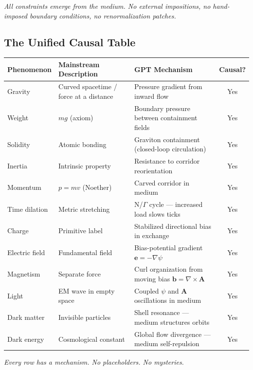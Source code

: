 \documentclass[12pt, a4paper]{article}
\begin{document}
\textit{All constraints emerge from the medium. No external impositions, no hand-imposed boundary conditions, no renormalization patches.}

\subsection{The Unified Causal Table}
\label{subsec:unified_table}

\begin{center}
\small
\begin{tabular}{|p{3cm}|p{4.5cm}|p{5.5cm}|c|}
\hline
\textbf{Phenomenon} & \textbf{Mainstream Description} & \textbf{GPT Mechanism} & \textbf{Causal?} \\
\hline
Gravity & Curved spacetime / force at a distance & Pressure gradient from inward flow & Yes \\
\hline
Weight & \( mg \) (axiom) & Boundary pressure between containment fields & Yes \\
\hline
Solidity & Atomic bonding & Graviton containment (closed-loop circulation) & Yes \\
\hline
Inertia & Intrinsic property & Resistance to corridor reorientation & Yes \\
\hline
Momentum & \( p = mv \) (Noether) & Carved corridor in medium & Yes \\
\hline
Time dilation & Metric stretching & N/\(\Gamma\) cycle — increased load slows ticks & Yes \\
\hline
Charge & Primitive label & Stabilized directional bias in exchange & Yes \\
\hline
Electric field & Fundamental field & Bias-potential gradient \( \mathbf{e} = -\nabla \psi \) & Yes \\
\hline
Magnetism & Separate force & Curl organization from moving bias \( \mathbf{b} = \nabla \times \mathbf{A} \) & Yes \\
\hline
Light & EM wave in empty space & Coupled \( \psi \) and \( \mathbf{A} \) oscillations in medium & Yes \\
\hline
Dark matter & Invisible particles & Shell resonance — medium structures orbits & Yes \\
\hline
Dark energy & Cosmological constant & Global flow divergence — medium self-repulsion & Yes \\
\hline
\end{tabular}
\end{center}

\textit{Every row has a mechanism. No placeholders. No mysteries.}
\end{document}
